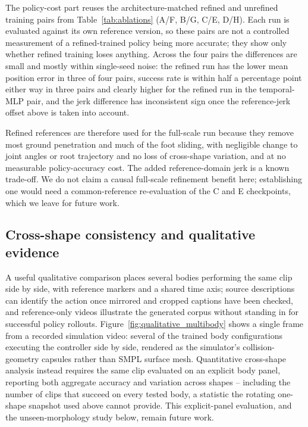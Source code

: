 The policy-cost part reuses the architecture-matched refined and unrefined
training pairs from Table~\ref{tab:ablations} (A/F, B/G, C/E, D/H). Each run
is evaluated against its own reference version, so these pairs are not a
controlled measurement of a refined-trained policy being more accurate; they
show only whether refined training loses anything. Across the four pairs the
differences are small and mostly within single-seed noise: the refined run
has the lower mean position error in three of four pairs, success rate is
within half a percentage point either way in three pairs and clearly higher
for the refined run in the temporal-MLP pair, and the jerk difference has
inconsistent sign once the reference-jerk offset above is taken into account.

Refined references are therefore used for the full-scale run because they
remove most ground penetration and much of the foot sliding, with negligible
change to joint angles or root trajectory and no loss of cross-shape
variation, and at no measurable policy-accuracy cost. The added
reference-domain jerk is a known trade-off. We do not claim a causal
full-scale refinement benefit here; establishing one would need a
common-reference re-evaluation of the C and E checkpoints, which we leave
for future work.

\subsection{Cross-shape consistency and qualitative evidence}

A useful qualitative comparison places several bodies performing the same
clip side by side, with reference markers and a shared time axis; source
descriptions can identify the action once mirrored and cropped captions have
been checked, and reference-only videos illustrate the generated corpus
without standing in for successful policy rollouts. Figure~\ref{fig:qualitative_multibody}
shows a single frame from a recorded simulation video: several of the
trained body configurations executing the controller side by side, rendered
as the simulator's collision-geometry capsules rather than SMPL surface
mesh. Quantitative cross-shape analysis instead requires the same clip
evaluated on an explicit body panel, reporting both aggregate accuracy and
variation across shapes -- including the number of clips that succeed on
every tested body, a statistic the rotating one-shape snapshot used above
cannot provide. This explicit-panel evaluation, and the unseen-morphology
study below, remain future work.

